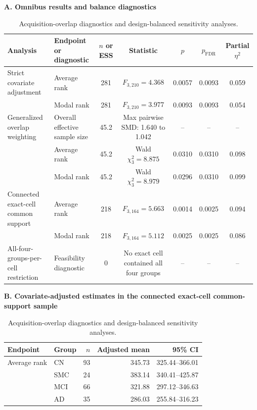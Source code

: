 \documentclass{article}
\begin{document}
\begin{table}[!htbp]
\centering
\caption{Acquisition-overlap diagnostics and design-balanced sensitivity analyses.}
\label{tab:acquisition_overlap}
\footnotesize
\setlength{\tabcolsep}{3pt}
\textbf{A. Omnibus results and balance diagnostics}\par\vspace{1mm}
\begin{tabularx}{\textwidth}{@{}>{\raggedright\arraybackslash}p{}>{\raggedright\arraybackslash}Xccccc@{}}
\toprule
Analysis & Endpoint or diagnostic & $n$ or ESS & Statistic & $p$ & $p_{\mathrm{FDR}}$ & Partial $\eta^2$\\
\midrule
Strict covariate adjustment & Average rank & 281 & $F_{3,210}=4.368$ & 0.0057 & 0.0093 & 0.059\\
& Modal rank & 281 & $F_{3,210}=3.977$ & 0.0093 & 0.0093 & 0.054\\
\addlinespace
Generalized overlap weighting & Overall effective sample size & 45.2 & Max pairwise SMD: 1.640 to 1.042 & -- & -- & --\\
& Average rank & 45.2 & Wald $\chi^2_3=8.875$ & 0.0310 & 0.0310 & 0.098\\
& Modal rank & 45.2 & Wald $\chi^2_3=8.979$ & 0.0296 & 0.0310 & 0.099\\
\addlinespace
Connected exact-cell common support & Average rank & 218 & $F_{3,164}=5.663$ & 0.0014 & 0.0025 & 0.094\\
& Modal rank & 218 & $F_{3,164}=5.112$ & 0.0025 & 0.0025 & 0.086\\
\addlinespace
All-four-groups-per-cell restriction & Feasibility diagnostic & 0 & No exact cell contained all four groups & -- & -- & --\\
\bottomrule
\end{tabularx}
\par\vspace{3mm}
\textbf{B. Covariate-adjusted estimates in the connected exact-cell common-support sample}\par\vspace{1mm}
\begin{tabular}{llrrr}
\toprule
Endpoint & Group & $n$ & Adjusted mean & 95\% CI\\
\midrule
Average rank & CN & 93 & 345.73 & 325.44--366.01\\
& SMC & 24 & 383.14 & 340.41--425.87\\
& MCI & 66 & 321.88 & 297.12--346.63\\
& AD & 35 & 286.03 & 255.84--316.23\\

\end{tabular}
\end{table}
\end{document}
